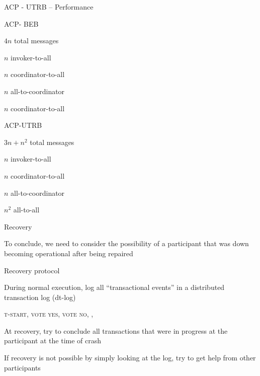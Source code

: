 \begin{frame}{ACP - UTRB – Performance}
	
\BI	
\item ACP- BEB
	\BI
	\item  $4n$ total messages
	\item   $n$ invoker-to-all
	\item   $n$ coordinator-to-all
	\item   $n$ all-to-coordinator
	\item   $n$ coordinator-to-all
	\EI
\smallskip
\item ACP-UTRB
	\BI
	\item   $3n + n^2$ total messages
	\item   $n$ invoker-to-all
	\item   $n$ coordinator-to-all
	\item   $n$ all-to-coordinator
	\item   $n^2$ all-to-all
	\EI
\EI
\end{frame}

\begin{frame}{Recovery}

\BI
\item To conclude, we need to consider the possibility of a participant that was down becoming operational after being repaired
\EI

\begin{block}{Recovery protocol}
  \BI
  \item During normal execution, log all “transactional events” in a \alert{distributed transaction log} (dt-log)
  	\BI
  	\item \textsc{t-start}, \textsc{vote yes}, \textsc{vote no}, \COMMIT, \ABORT
  	\EI
  \item At recovery, try to conclude all transactions that were in progress at the participant at the time of crash
  \item If recovery is not possible by simply looking at the log, try to get help from other participants
  \EI
\end{block}
  

\end{frame}

